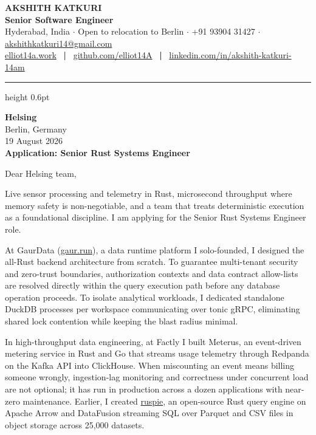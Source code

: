 \documentclass[10pt,a4paper]{article}
\begin{document}
\begin{center}
  {\fontsize{18pt}{20pt}\selectfont \textbf{\color{primary}AKSHITH KATKURI}}\\[2.5pt]
  {\fontsize{10.5pt}{12pt}\selectfont \textbf{\color{primary}Senior Software Engineer}}\\[3pt]
  {\small Hyderabad, India $\cdot$ Open to relocation to Berlin $\cdot$ +91 93904 31427 $\cdot$ \href{mailto:akshithkatkuri14@gmail.com}{akshithkatkuri14@gmail.com}}\\[2pt]
  {\small \href{https://elliot14a.work}{elliot14a.work} \ \textbf{|} \ \href{https://github.com/elliot14A}{github.com/elliot14A} \ \textbf{|} \ \href{https://linkedin.com/in/akshith-katkuri-14am}{linkedin.com/in/akshith-katkuri-14am}}
\end{center}
\vspace{2pt}
\hrule height 0.6pt \color{primary}
\vspace{8pt}

\noindent \textbf{Helsing}\\
Berlin, Germany\\
19 August 2026\\[3pt]
\textbf{Application: Senior Rust Systems Engineer}

\vspace{3pt}

Dear Helsing team,

Live sensor processing and telemetry in Rust, microsecond throughput where memory safety is non-negotiable, and a team that treats deterministic execution as a foundational discipline. I am applying for the Senior Rust Systems Engineer role.

At GaurData (\href{https://gaur.run}{gaur.run}), a data runtime platform I solo-founded, I designed the all-Rust backend architecture from scratch. To guarantee multi-tenant security and zero-trust boundaries, authorization contexts and data contract allow-lists are resolved directly within the query execution path before any database operation proceeds. To isolate analytical workloads, I dedicated standalone DuckDB processes per workspace communicating over tonic gRPC, eliminating shared lock contention while keeping the blast radius minimal.

In high-throughput data engineering, at Factly I built Meterus, an event-driven metering service in Rust and Go that streams usage telemetry through Redpanda on the Kafka API into ClickHouse. When miscounting an event means billing someone wrongly, ingestion-lag monitoring and correctness under concurrent load are not optional; it has run in production across a dozen applications with near-zero maintenance. Earlier, I created \href{https://github.com/factly/ruspie}{ruspie}, an open-source Rust query engine on Apache Arrow and DataFusion streaming SQL over Parquet and CSV files in object storage across 25,000 datasets.
\end{document}
